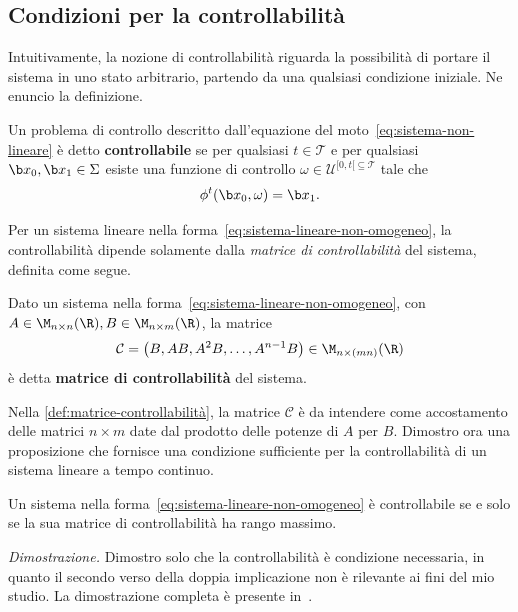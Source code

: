 \subsection{Condizioni per la controllabilità}
\label{subsec:condizioni-controllabilità}
Intuitivamente, la nozione di controllabilità riguarda la possibilità di portare il sistema
in uno stato arbitrario, partendo da una qualsiasi condizione iniziale.
Ne enuncio la definizione.
\begin{definition}
    Un problema di controllo descritto dall'equazione del moto~\eqref{eq:sistema-non-lineare}
    è detto \textbf{controllabile} se per qualsiasi $t \in \mathcal T$ e per qualsiasi $\b x_0, \b x_1 \in \Sigma$
    esiste una funzione di controllo $\omega \in  \mathcal U^{[0, t[ \subseteq \mathcal T}$ tale che
    \begin{equation*}
        \phi^t(\b x_0, \omega) = \b x_1.
    \end{equation*}
    \label{def:controllabilità}
\end{definition}

Per un sistema lineare nella forma~\eqref{eq:sistema-lineare-non-omogeneo},
la controllabilità dipende solamente dalla \emph{matrice di controllabilità} del sistema, definita come segue.
\begin{definition}
    Dato un sistema nella forma~\eqref{eq:sistema-lineare-non-omogeneo}, con $A \in \M_{n\times n}(\R), B \in \M_{n\times m}(\R)$,
    la matrice
    \begin{equation*}
        \mathcal C = \left(B, AB, A^2B, \ldots, A^{n-1}B \right) \in \M_{n\times (mn)}(\R)
    \end{equation*}
    è detta \textbf{matrice di controllabilità} del sistema.
    \label{def:matrice-controllabilità}
\end{definition}
Nella \autoref{def:matrice-controllabilità}, la matrice $\mathcal C$ è
da intendere come accostamento delle matrici $n \times m$ date dal prodotto delle
potenze di $A$ per $B$.
Dimostro ora una proposizione che fornisce una condizione sufficiente per
la controllabilità di un sistema lineare a tempo continuo.

\begin{prop}
    Un sistema nella forma~\eqref{eq:sistema-lineare-non-omogeneo} è controllabile
    se e solo se la sua matrice di controllabilità ha rango massimo.
    \label{prop:condizione-controllabilità}
\end{prop}
\emph{Dimostrazione.}
Dimostro solo che la controllabilità è condizione necessaria, in quanto
il secondo verso della doppia implicazione non è rilevante ai fini del mio studio.
La dimostrazione completa è presente in~\cite{controllability-and-obs}.


